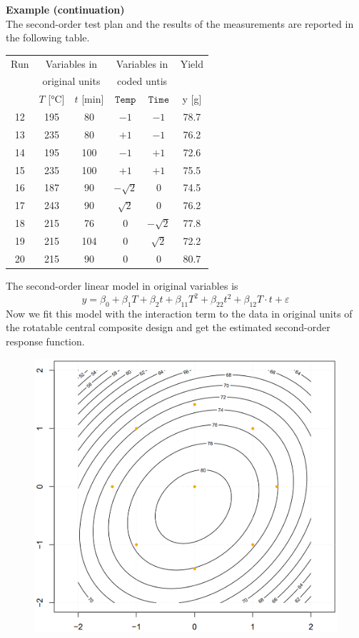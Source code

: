 \textbf{Example (continuation)}\\
The second-order test plan and the results of the measurements are reported in the following table.
\begin{table}[H]
  \centering
  \scriptsize
    \begin{tabular}{c|cc|cc|c}
      Run & \multicolumn{2}{c}{Variables in}   & \multicolumn{2}{c}{Variables in} & Yield \\
          & \multicolumn{2}{c}{original units} & \multicolumn{2}{c}{coded untis}  &       \\
          & $T$ [°C] & $t$ [min]               & $\texttt{Temp}$ & $\texttt{Time}$ & y [g]\\ \hline
      12 & 195 & 80  & $-1$        & $-1$        & 78.7 \\
      13 & 235 & 80  & $+1$        & $-1$        & 76.2 \\
      14 & 195 & 100 & $-1$        & $+1$        & 72.6 \\
      15 & 235 & 100 & $+1$        & $+1$        & 75.5 \\
      16 & 187 & 90  & $-\sqrt{2}$ & 0           & 74.5 \\
      17 & 243 & 90  & $ \sqrt{2}$ & 0           & 76.2 \\
      18 & 215 & 76  & 0           & $-\sqrt{2}$ & 77.8 \\
      19 & 215 & 104 & 0           & $ \sqrt{2}$ & 72.2 \\
      20 & 215 & 90  & 0           & 0           & 80.7
    \end{tabular}
\end{table}
The second-order linear model in original variables is
\begin{equation}
  y = \beta_0 + \beta_1 T + \beta_2 t + \beta_{11} T^2 + \beta_{22}t^2 + \beta_{12}T\cdot t + \varepsilon
\end{equation}
Now we fit this model with the interaction term to the data in original units of the rotatable central composite design and get the estimated second-order response function.

\begin{figure}[H]
  \centering
  \includegraphics[width=.6\linewidth]{Pics/15.2.1.png}
\end{figure}

